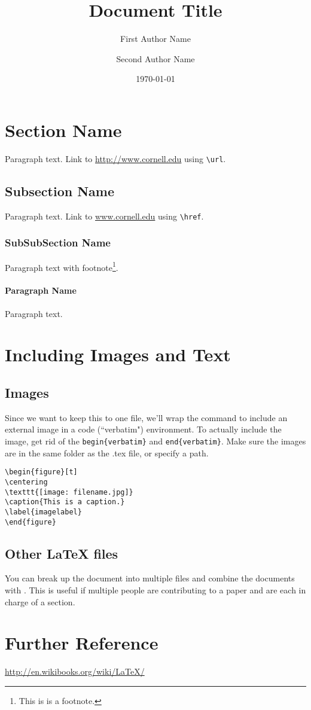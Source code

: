 \documentclass[11pt,letterpaper]{article}
\title{Document Title}
\author{First Author Name \and Second Author Name}
\date{\today}
\begin{document}
\maketitle
\tableofcontents %

\section{Section Name}
Paragraph text. Link to \url{http://www.cornell.edu} using \verb+\url+.

\subsection{Subsection Name}
Paragraph text. Link to \href{http://www.cornell.edu}{www.cornell.edu} using \verb+\href+.

\subsubsection{SubSubSection Name}
Paragraph text with footnote\footnote{This is is a footnote.}.

\paragraph{Paragraph Name}
Paragraph text.

\section{Including Images and Text}
\subsection{Images}
Since we want to keep this to one file, we'll wrap the command to include an external image in a code (``verbatim") environment. To actually include the image, get rid of the \verb+begin{verbatim}+ and \verb+end{verbatim}+. Make sure the images are in the same folder as the .tex file, or specify a path.

\begin{verbatim}
\begin{figure}[t]
\centering
\texttt{[image: filename.jpg]}
\caption{This is a caption.}
\label{imagelabel}
\end{figure}
\end{verbatim}

\subsection{Other LaTeX files}

You can break up the document into multiple files and combine the documents with \verb++. This is useful if multiple people are contributing to a paper and are each in charge of a section.

\section{Further Reference}
\url{http://en.wikibooks.org/wiki/LaTeX/}
\end{document}
